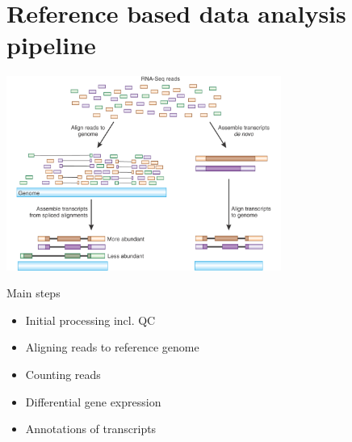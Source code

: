 \documentclass{beamer}\usepackage[]{graphicx}\usepackage[]{color}
\begin{document}
\section{Reference based data analysis pipeline}

\begin{frame}
\centering
\includegraphics[width=9cm]{Images/workflows.pdf}
\end{frame}

\begin{frame}
\begin{block}{Main steps}
\begin{itemize}
  \item Initial processing incl. QC
  \item Aligning reads to reference genome
  \item Counting reads
  \item Differential gene expression
  \item Annotations of transcripts
\end{itemize}
\end{block}
\end{frame}
\end{document}
